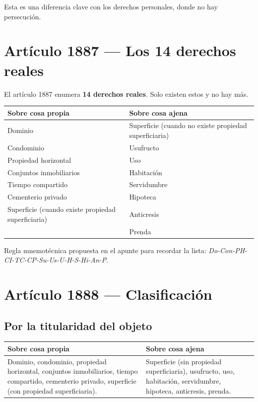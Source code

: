 \documentclass[12pt,oneside]{book}
\begin{document}
Esta es una diferencia clave con los derechos personales, donde no hay persecuci\'on.

\section{Art\'iculo 1887 --- Los 14 derechos reales}

El art\'iculo 1887 enumera \textbf{14 derechos reales}. Solo existen estos y no hay m\'as.

\begin{table}[H]
\centering
\begin{tabularx}{\textwidth}{
    >{\raggedright\arraybackslash}X
    >{\raggedright\arraybackslash}X
}
\toprule
\textbf{Sobre cosa propia} & \textbf{Sobre cosa ajena} \\
\midrule
Dominio &
Superficie (cuando no existe propiedad superficiaria) \\
Condominio & Usufructo \\
Propiedad horizontal & Uso \\
Conjuntos inmobiliarios & Habitaci\'on \\
Tiempo compartido & Servidumbre \\
Cementerio privado & Hipoteca \\
Superficie (cuando existe propiedad superficiaria) & Anticresis \\
 & Prenda \\
\bottomrule
\end{tabularx}
\end{table}

\begin{note}
Regla mnemot\'ecnica propuesta en el apunte para recordar la lista: \textit{Do-Con-PH-CI-TC-CP-Su-Us-U-H-S-Hi-An-P}.
\end{note}

\section{Art\'iculo 1888 --- Clasificaci\'on}

\subsection{Por la titularidad del objeto}

\begin{table}[H]
\centering
\begin{tabularx}{\textwidth}{
    >{\raggedright\arraybackslash}X
    >{\raggedright\arraybackslash}X
}
\toprule
\textbf{Sobre cosa propia} & \textbf{Sobre cosa ajena} \\
\midrule
Dominio, condominio, propiedad horizontal, conjuntos inmobiliarios, tiempo compartido, cementerio privado, superficie (con propiedad superficiaria). &
Superficie (sin propiedad superficiaria), usufructo, uso, habitaci\'on, servidumbre, hipoteca, anticresis, prenda. \\
\bottomrule
\end{tabularx}
\end{table}
\end{document}
